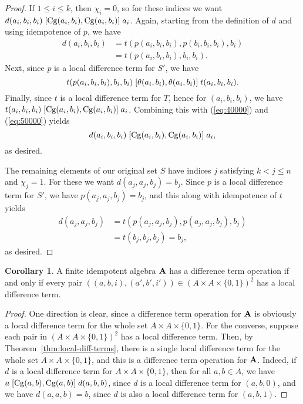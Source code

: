 \documentclass[12pt]{amsart}
\numberwithin{equation}{section}
\theoremstyle{plain}
\theoremstyle{definition}
\newtheorem*{cor}{Corollary}
\begin{document}
\begin{proof}
If $1\leq i \leq k$, then $\chi_i =0$, so for these indices we want
$d(a_i,b_i,b_i) \mathrel{[\operatorname{Cg}(a_i,b_i), \operatorname{Cg}(a_i,b_i)]} a_i$.
Again, starting from the definition of $d$ and using idempotence of $p$, we have
\begin{align}
  d(a_i,b_i,b_i) &=
  t(p(a_i,b_i,b_i), p(b_i,b_i,b_i), b_i)   \label{eq:40000}\\
  &=t(p(a_i,b_i,b_i), b_i, b_i). \nonumber
\end{align}
Next, since $p$ is a local difference term for $S'$, we have
\begin{equation}
  \label{eq:50000}
  t(p(a_i,b_i,b_i), b_i, b_i)
 \mathrel{[\theta(a_i,b_i), \theta(a_i,b_i)]}
 t(a_i, b_i, b_i).
\end{equation}
Finally, since $t$ is a local difference term for $T$, hence for
$(a_i, b_i, b_i)$,  %
we have 
$t(a_i, b_i, b_i) \mathrel{[\operatorname{Cg}(a_i,b_i), \operatorname{Cg}(a_i,b_i)]} a_i$.
Combining this with (\ref{eq:40000}) and (\ref{eq:50000}) yields
\[
d(a_i,b_i,b_i) \mathrel{[\operatorname{Cg}(a_i,b_i), \operatorname{Cg}(a_i,b_i)]} a_i,
\]
as desired.

The remaining elements of our original set $S$
have indices $j$ satisfying $k<j\leq n$ and $\chi_j = 1$.
For these we want $d(a_j,a_j,b_j) = b_j$.
Since $p$ is a local difference term for $S'$, we have
$p(a_j,a_j,b_j) = b_j$, and this along with idempotence of $t$ yields
\begin{align*}
d(a_j,a_j,b_j) &=
t(p(a_j,a_j,b_j), p(a_j,a_j,b_j), b_j)\\
&=t(b_j, b_j, b_j) =b_j,
\end{align*}
as desired.
\end{proof}

\begin{cor}
  \label{cor:loc-diff-term}
  A finite idempotent algebra $\mathbf{A}$ has a difference term operation if and
  only if every pair $((a,b,i), (a',b',i')) \in (A\times A \times \{0,1\})^2$ has a local
  difference term.
\end{cor}
\begin{proof}
  One direction is clear, since a difference term operation for $\mathbf{A}$ is
  obviously a local difference term for the whole set 
  $A\times A \times \{0,1\}$.
  For the converse, suppose
  each pair in $(A\times A \times \{0,1\})^2$ has a local
  difference term. Then, by Theorem~\ref{thm:local-diff-terms},
  there is a single local difference term for the whole set $A\times A \times \{0,1\}$,
  and this is a difference term operation for $\mathbf{A}$.  Indeed, if $d$ is a
  local difference term for $A\times A \times \{0,1\}$, then 
  for all $a, b \in A$, we have
  $a \mathrel{[\operatorname{Cg}(a,b), \operatorname{Cg}(a,b)]} d(a,b,b)$,
  since $d$ is a local difference term for $(a,b,0)$, and we have
  $d(a,a,b) = b$, since $d$ is also a local difference term for
  $(a,b,1)$.
\end{proof}
\end{document}

